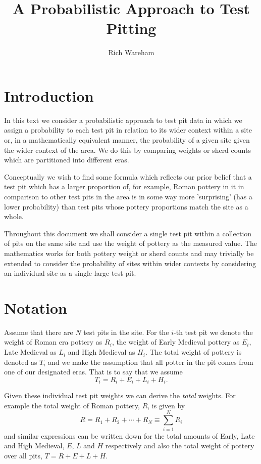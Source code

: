 \documentclass[a4paper]{paper}
\title{A Probabilistic Approach to Test Pitting}
\author{Rich Wareham}
\begin{document}
\maketitle

\section{Introduction}

In this text we consider a probabilistic approach to test pit data in which we
assign a probability to each test pit in relation to its wider context within a
site or, in a mathematically equivalent manner, the probability of a given site
given the wider context of the area. We do this by comparing weights or sherd
counts which are partitioned into different eras.

Conceptually we wish to find some formula which reflects our prior belief that a
test pit which has a larger proportion of, for example, Roman pottery in it in
comparison to other test pits in the area is in some way more 'surprising' (has
a lower probability) than test pits whose pottery proportions match the site as
a whole.

Throughout this document we shall consider a single test pit within a collection
of pits on the same site and use the weight of pottery as the measured value.
The mathematics works for both pottery weight or sherd counts and may trivially
be extended to consider the probability of sites within wider contexts by
considering an individual site as a single large test pit.

\section{Notation}

Assume that there are $N$ test pits in the site. For the $i$-th test pit we
denote the weight of Roman era pottery as $R_i$, the weight of Early Medieval
pottery as $E_i$, Late Medieval as $L_i$ and High Medieval as $H_i$. The total
weight of pottery is denoted as $T_i$ and we make the assumption that all potter
in the pit comes from one of our designated eras. That is to say that we assume
\[
    T_i = R_i + E_i + L_i + H_i.
\]

Given these individual test pit weights we can derive the \emph{total} weights.
For example the total weight of Roman pottery, $R$, is given by
\[
    R = R_1 + R_2 + \cdots + R_N \equiv \sum_{i=1}^N R_i
\]
and similar expressions can be written down for the total amounts of Early, Late
and High Medieval, $E$, $L$ and $H$ respectively and also the total weight of
pottery over all pits, $T = R + E + L + H$.
\end{document}
